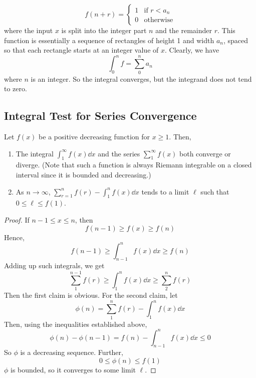\begin{enumerate}[(1)]
	      \[
		      f(n + r) = \begin{cases}
			      1 & \text{if } r < a_n \\
			      0 & \text{otherwise}
		      \end{cases}
	      \]
	      where the input \(x\) is split into the integer part \(n\) and the remainder \(r\).
	      This function is essentially a sequence of rectangles of height 1 and width \(a_n\), spaced so that each rectangle starts at an integer value of \(x\).
	      Clearly, we have
	      \[
		      \int_0^n f = \sum_0^n a_n
	      \]
	      where \(n\) is an integer.
	      So the integral converges, but the integrand does not tend to zero.
\end{enumerate}

\subsection{Integral Test for Series Convergence}
\begin{theorem}
	Let \(f(x)\) be a positive decreasing function for \(x \geq 1\).
	Then,
	\begin{enumerate}[(1)]
		\item The integral \(\int_1^\infty f(x) \dd{x}\) and the series \(\sum_1^\infty f(x)\) both converge or diverge.
		      (Note that such a function is always Riemann integrable on a closed interval since it is bounded and decreasing.)
		\item As \(n \to \infty\), \(\sum_{r=1}^n f(r) - \int_1^n f(x) \dd{x}\) tends to a limit \(\ell\) such that \(0 \leq \ell \leq f(1)\).
	\end{enumerate}
\end{theorem}
\begin{proof}
	If \(n-1 \leq x \leq n\), then
	\[
		f(n-1) \geq f(x) \geq f(n)
	\]
	Hence,
	\[
		f(n-1) \geq \int_{n-1}^n f(x) \dd{x} \geq f(n)
	\]
	Adding up such integrals, we get
	\[
		\sum_1^{n-1} f(r) \geq \int_1^n f(x) \dd{x} \geq \sum_2^{n} f(r)
	\]
	Then the first claim is obvious.
	For the second claim, let
	\[
		\phi(n) = \sum_1^n f(r) - \int_1^n f(x) \dd{x}
	\]
	Then, using the inequalities established above,
	\[
		\phi(n) - \phi(n-1) = f(n) - \int_{n-1}^n f(x) \dd{x} \leq 0
	\]
	So \(\phi\) is a decreasing sequence.
	Further,
	\[
		0 \leq \phi(n) \leq f(1)
	\]
	\(\phi\) is bounded, so it converges to some limit \(\ell\).
\end{proof}


